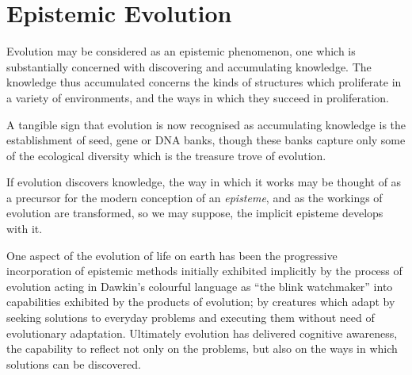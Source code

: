 \chapter{Epistemic Evolution}\label{EpistemicEvolution}

Evolution may be considered as an epistemic phenomenon, one which is substantially concerned with discovering and accumulating knowledge.
The knowledge thus accumulated concerns the kinds of structures which proliferate in a variety of environments, and the ways in which they succeed in proliferation.

A tangible sign that evolution is now recognised as accumulating knowledge is the establishment of seed, gene or DNA banks, though these banks capture only some of the ecological diversity which is the treasure trove of evolution.

If evolution discovers knowledge, the way in which it works may be thought of as a precursor for the modern conception of an \emph{episteme}, and as the workings of evolution are transformed, so we may suppose, the implicit episteme develops with it.

One aspect of the evolution of life on earth has been the progressive incorporation of epistemic methods initially exhibited implicitly by the process of evolution acting in Dawkin's colourful language as ``the blink watchmaker'' into capabilities exhibited by the products of evolution; by creatures which adapt by seeking solutions to everyday problems and executing them without need of evolutionary adaptation.
Ultimately evolution has delivered cognitive awareness, the capability to reflect not only on the problems, but also on the ways in which solutions can be discovered.


